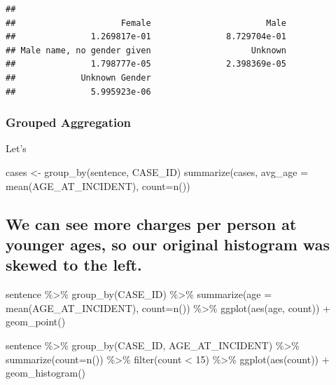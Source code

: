 \documentclass[]{article}
\newenvironment{Shaded}{\begin{snugshade}}{\end{snugshade}}
\newcommand{\KeywordTok}[1]{\textcolor[rgb]{0.13,0.29,0.53}{\textbf{#1}}}
\newcommand{\OperatorTok}[1]{\textcolor[rgb]{0.81,0.36,0.00}{\textbf{#1}}}
\newcommand{\NormalTok}[1]{#1}
\begin{document}
\begin{Shaded}
\end{Shaded}

\begin{verbatim}
## 
##                     Female                       Male 
##               1.269817e-01               8.729704e-01 
## Male name, no gender given                    Unknown 
##               1.798777e-05               2.398369e-05 
##             Unknown Gender 
##               5.995923e-06
\end{verbatim}

\subsubsection{Grouped Aggregation}\label{grouped-aggregation}

Let's

cases \textless{}- group\_by(sentence, CASE\_ID) summarize(cases,
avg\_age = mean(AGE\_AT\_INCIDENT), count=n())

\subsection{We can see more charges per person at younger ages, so our
original histogram was skewed to the
left.}\label{we-can-see-more-charges-per-person-at-younger-ages-so-our-original-histogram-was-skewed-to-the-left.}

sentence \%\textgreater{}\% group\_by(CASE\_ID) \%\textgreater{}\%
summarize(age = mean(AGE\_AT\_INCIDENT), count=n()) \%\textgreater{}\%
ggplot(aes(age, count)) + geom\_point()

sentence \%\textgreater{}\% group\_by(CASE\_ID, AGE\_AT\_INCIDENT)
\%\textgreater{}\% summarize(count=n()) \%\textgreater{}\% filter(count
\textless{} 15) \%\textgreater{}\% ggplot(aes(count)) +
geom\_histogram()

\begin{Shaded}
\end{Shaded}
\end{document}
